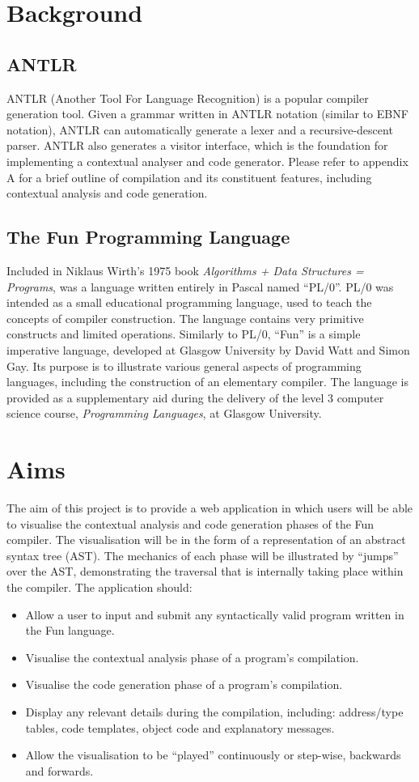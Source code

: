 \documentclass{l4proj}
\begin{document}
\section{Background}
\subsection{ANTLR}
ANTLR (Another Tool For Language Recognition) is a popular compiler generation tool. Given a grammar written in ANTLR notation (similar to EBNF notation), ANTLR can automatically generate a lexer and a recursive-descent parser. ANTLR also generates a visitor interface, which is the foundation for implementing a contextual analyser and code generator. Please refer to appendix A for a brief outline of compilation and its constituent features, including contextual analysis and code generation.

\subsection{The Fun Programming Language}
Included in Niklaus Wirth's 1975 book {\it Algorithms + Data Structures = Programs}, was a language written entirely in Pascal named ``PL/0''. PL/0 was intended as a small educational programming language, used to teach the concepts of compiler construction. The language contains very primitive constructs and limited operations. Similarly to PL/0, ``Fun'' is a simple imperative language, developed at Glasgow University by David Watt and Simon Gay. Its purpose is to illustrate various general aspects of programming languages, including the construction of an elementary compiler. The language is provided as a supplementary aid during the delivery of the level 3 computer science course, {\it Programming Languages}, at Glasgow University.

\section{Aims}
The aim of this project is to provide a web application in which users will be able to visualise the contextual analysis and code generation phases of the Fun compiler. The visualisation will be in the form of a representation of an abstract syntax tree (AST). The mechanics of each phase will be illustrated by ``jumps'' over the AST, demonstrating the traversal that is internally taking place within the compiler. The application should:
\begin{itemize}
\item Allow a user to input and submit any syntactically valid program written in the Fun language.
\item Visualise the contextual analysis phase of a program's compilation. 
\item Visualise the code generation phase of a program's compilation.
\item Display any relevant details during the compilation, including: address/type tables, code templates, object code and explanatory messages.
\item Allow the visualisation to be ``played'' continuously or step-wise, backwards and forwards.
\end{itemize}
\end{document}
